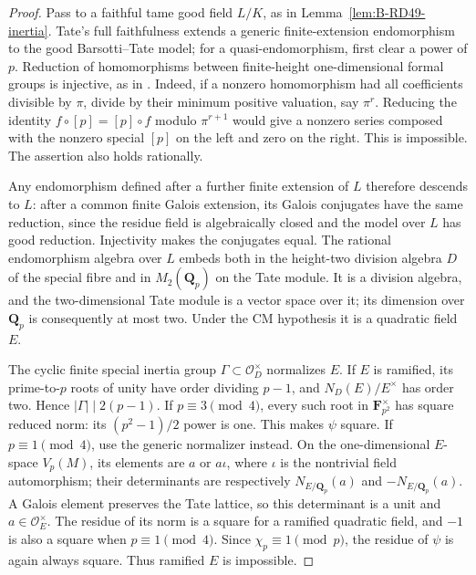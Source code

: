 \begin{proof}
Pass to a faithful tame good field $L/K$, as in
Lemma~\ref{lem:B-RD49-inertia}. Tate's full faithfulness
\cite[Theorem~4 and Corollaries~1--2, p.~181]{Tate1967PDivisible}
extends a generic finite-extension endomorphism to the good
Barsotti--Tate model; for a quasi-endomorphism, first clear a
power of $p$. Reduction of homomorphisms between finite-height
one-dimensional formal groups is injective, as in
\cite[Proposition~4.2 and its full proof]{HopkinsGross1994Bundles}.
Indeed, if a nonzero homomorphism had all coefficients divisible
by $\pi$, divide by their minimum positive valuation, say $\pi^r$.
Reducing the identity $f\circ[p]=[p]\circ f$ modulo
$\pi^{r+1}$ would give a nonzero series composed with the
nonzero special $[p]$ on the left and zero on the right.
This is impossible. The assertion also holds rationally.

Any endomorphism defined after a further finite extension of
$L$ therefore descends to $L$: after a common finite Galois
extension, its Galois conjugates have the same reduction, since
the residue field is algebraically closed and the model over
$L$ has good reduction. Injectivity makes the conjugates equal.
The rational endomorphism algebra over $L$ embeds both in the
height-two division algebra $D$ of the special fibre and in
$M_2(\mathbf Q_p)$ on the Tate module. It is a division algebra,
and the two-dimensional Tate module is a vector space over it;
its dimension over $\mathbf Q_p$ is consequently at most two.
Under the CM hypothesis it is a quadratic field $E$.

The cyclic finite special inertia group $\Gamma\subset\mathcal O_D^\times$
normalizes $E$. If $E$ is ramified, its prime-to-$p$ roots of
unity have order dividing $p-1$, and
$N_D(E)/E^\times$ has order two. Hence $|\Gamma|\mid2(p-1)$.
If $p\equiv3\pmod4$, every such root in
$\mathbf F_{p^2}^\times$ has square reduced norm: its
$(p^2-1)/2$ power is one. This makes $\psi$ square.
If $p\equiv1\pmod4$, use the generic normalizer instead.
On the one-dimensional $E$-space $V_p(M)$, its elements are
$a$ or $a\iota$, where $\iota$ is the nontrivial field
automorphism; their determinants are respectively
$N_{E/\mathbf Q_p}(a)$ and $-N_{E/\mathbf Q_p}(a)$.
A Galois element preserves the Tate lattice, so this determinant
is a unit and $a\in\mathcal O_E^\times$. The residue of its
norm is a square for a ramified quadratic field, and $-1$ is
also a square when $p\equiv1\pmod4$. Since
$\chi_p\equiv1\pmod p$, the residue of $\psi$ is again
always square. Thus ramified $E$ is impossible.


\end{proof}
